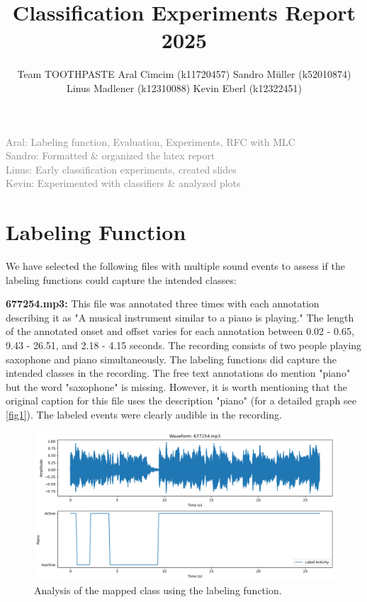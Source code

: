\documentclass{article}
\title{Classification Experiments Report 2025}
\author{%
  Team TOOTHPASTE \AND
  Aral Cimcim (k11720457)
  \And
  Sandro Müller (k52010874)
  \And 
  Linus Madlener (k12310088)
  \And 
  Kevin Eberl (k12322451)
}
\begin{document}
\maketitle

\begin{contributions}
    \textcolor{gray}{
    Aral: Labeling function, Evaluation, Experiments, RFC with MLC\\
    Sandro: Formatted \& organized the latex report\\
    Linus: Early classification experiments, created slides\\
    Kevin: Experimented with classifiers \& analyzed plots
    }
  
\end{contributions}

\section{Labeling Function}
We have selected the following files with multiple sound events to assess if the labeling functions could capture the intended classes:

\textbf{677254.mp3:}
This file was annotated three times with each annotation describing it as "A musical instrument similar to a piano is playing." The length of the annotated onset and offset varies for each annotation between 0.02 - 0.65, 9.43 - 26.51, and 2.18 - 4.15 seconds. The recording consists of two people playing saxophone and piano simultaneously. The labeling functions did capture the intended classes in the recording. The free text annotations do mention "piano" but the word "saxophone" is missing. However, it is worth mentioning that the original caption for this file uses the description "piano" (for a detailed graph see \autoref{fig1}). The labeled events were clearly audible in the recording.

\begin{figure}[H]
  \centering
  \includegraphics[width=0.75\linewidth]{output1.png}
  \caption{Analysis of the mapped class using the labeling function.}
  \label{fig1}
\end{figure}
\pagebreak
\end{document}
